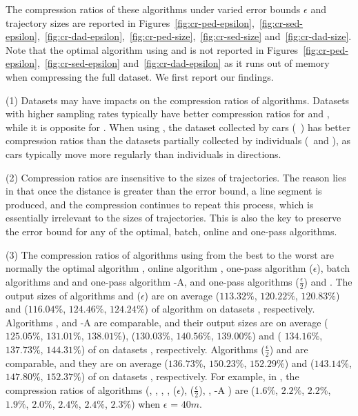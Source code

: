 The compression ratios of these algorithms under varied error bounds $\epsilon$ and trajectory sizes are reported in Figures~\ref{fig:cr-ped-epsilon},~\ref{fig:cr-sed-epsilon},~\ref{fig:cr-dad-epsilon},~\ref{fig:cr-ped-size},~\ref{fig:cr-sed-size} and~\ref{fig:cr-dad-size}.
{Note that the optimal algorithm using \sed and \dad is not reported in Figures~\ref{fig:cr-ped-epsilon},~\ref{fig:cr-sed-epsilon} and~\ref{fig:cr-dad-epsilon} as it runs out of memory when compressing the full dataset}. We first report our findings.


\sstab(1)  {Datasets may have impacts on the compression ratios of \lsa algorithms. Datasets with higher sampling rates typically have better compression ratios for \ped and \sed, while it is opposite for \dad. {When using \dad, the} dataset collected by cars (\eg~\ucar) has better compression ratios than the datasets partially collected by individuals (\eg~\geolife and \mopsi), as cars typically move more regularly than individuals {in directions}.}

\sstab(2) {Compression ratios are insensitive to the sizes of trajectories.} {The reason lies in that once the distance is greater than the error bound, a line segment is produced, and the compression continues to repeat this process, which is essentially irrelevant to the sizes of trajectories. This is also the key to preserve the error bound for any of the optimal, batch, online and one-pass algorithms.}




\sstab(3) The compression ratios of algorithms using \ped from the best
to the worst are normally the optimal algorithm \opt, online algorithm \bqsa, one-pass algorithm \siped($\epsilon$), batch algorithms \tpa and \dpa and one-pass algorithm {\operb-A}, and one-pass algorithms \siped($\frac{\epsilon}{2}$) and \operb.
The output sizes of algorithms \bqsa and \siped({$\epsilon$}) are on average
($113.32\%$, $120.22\%$, $120.83\%$) and ($116.04\%$, $124.46\%$, $124.24\%$) of algorithm \opt
on datasets \dSets, respectively.
Algorithms \tpa, \dpa and {\operb-A} are comparable, and their output sizes are on average
($125.05\%$, $131.01\%$, $138.01\%$), ($130.03\%$, $140.56\%$, $139.00\%$) and {( $134.16\%$, $137.73\%$, $144.31\%$)} of \opt
on datasets \dSets, respectively.
Algorithms \siped($\frac{\epsilon}{2}$) and \operb are comparable, and they are on average
($136.73\%$, $150.23\%$, $152.29\%$) and ($143.14\%$, $147.80\%$, $152.37\%$) of \opt on datasets \dSets, respectively.
%
For example, in \mopsi, the compression ratios of algorithms
(\opt, \tpa, \dpa, \bqsa, \siped(${\epsilon}$), \siped($\frac{\epsilon}{2}$), \operb, {\operb-A} ) are ($1.6\%$, $2.2\%$, $2.2\%$, $1.9\%$, $2.0\%$, $2.4\%$, $2.4\%$, {$2.3\%$}) when $\epsilon$ = $40m$.
%


